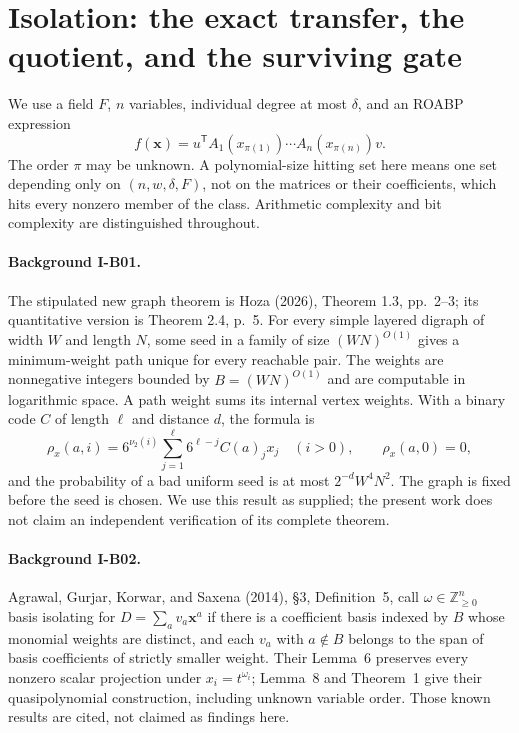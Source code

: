 \documentclass[11pt,a4paper]{article}
\theoremstyle{definition}\newtheorem{definition}{Definition}
\begin{document}


\section{Isolation: the exact transfer, the quotient, and the surviving gate}
\label{sec:isolation-track}

We use a field $F$, $n$ variables, individual degree at most $\delta$, and
an ROABP expression
\[
 f(\mathbf x)=u^{\mathsf T}A_1(x_{\pi(1)})\cdots A_n(x_{\pi(n)})v.
\]
The order $\pi$ may be unknown.  A polynomial-size hitting set here means
one set depending only on $(n,w,\delta,F)$, not on the matrices or their
coefficients, which hits every nonzero member of the class.  Arithmetic
complexity and bit complexity are distinguished throughout.

\paragraph{Background I-B01.}
The stipulated new graph theorem is Hoza (2026), Theorem 1.3, pp.~2--3;
its quantitative version is Theorem 2.4, p.~5.  For every simple layered
digraph of width $W$ and length $N$, some seed in a family of size
$(WN)^{O(1)}$ gives a minimum-weight path unique for every reachable pair.
The weights are nonnegative integers bounded by $B=(WN)^{O(1)}$ and are
computable in logarithmic space.  A path weight sums its internal vertex
weights.  With a binary code $C$ of length $\ell$ and distance $d$, the
formula is
\[
 \rho_x(a,i)=6^{\nu_2(i)}\sum_{j=1}^{\ell}6^{\ell-j}C(a)_j x_j
 \quad(i>0),\qquad \rho_x(a,0)=0,
\tag{I.1}\label{eq:I-hoza}
\]
and the probability of a bad uniform seed is at most
$2^{-d}W^4N^2$.  The graph is fixed before the seed is chosen.
We use this result as supplied; the present work does not claim an
independent verification of its complete theorem.

\paragraph{Background I-B02.}
Agrawal, Gurjar, Korwar, and Saxena (2014), \S3, Definition~5, call
$\omega\in\mathbb Z_{\geq0}^{n}$ basis isolating for
$D=\sum_a v_a\mathbf x^a$ if there is a coefficient basis indexed by $B$
whose monomial weights are distinct, and each $v_a$ with $a\notin B$
belongs to the span of basis coefficients of strictly smaller weight.
Their Lemma~6 preserves every nonzero scalar projection under
$x_i=t^{\omega_i}$; Lemma~8 and Theorem~1 give their quasipolynomial
construction, including unknown variable order.  Those known results
are cited, not claimed as findings here.
\end{document}
